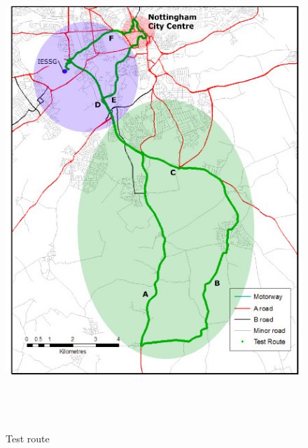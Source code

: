 \documentclass[11pt,fleqn]{book} %
\begin{document}
\begin{figure}[tbh]
\centering\includegraphics[clip,height=18cm]{pic/TrajectoryLayout}%
\caption{Test route \label{fig:Van-trajectory}}
\end{figure}



\end{document}
